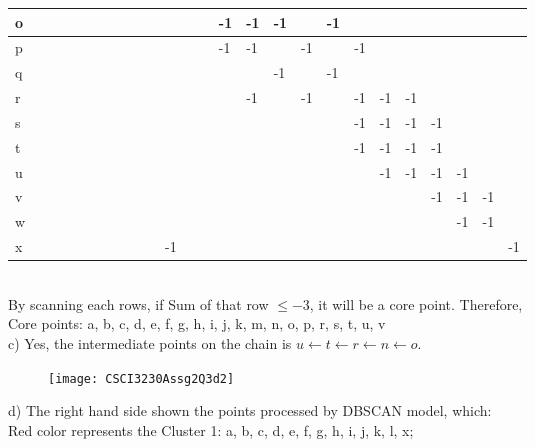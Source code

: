 \documentclass[12pt]{article}
\begin{document}
\begin{table}[h]
\begin{tabular}{|l|l|l|l|l|l|l|l|l|l|l|l|l|l|l|l|l|l|l|l|l|l|l|l|l|}
o &    &    &    &    &    &    &    &    &    &    &    &    & -1 & -1 & -1 &    & -1 &    &    &    &    &    &    &    \\ \hline
p &    &    &    &    &    &    &    &    &    &    &    &    & -1 & -1 &    & -1 &    & -1 &    &    &    &    &    &    \\ \hline
q &    &    &    &    &    &    &    &    &    &    &    &    &    &    & -1 &    & -1 &    &    &    &    &    &    &    \\ \hline
r &    &    &    &    &    &    &    &    &    &    &    &    &    & -1 &    & -1 &    & -1 & -1 & -1 &    &    &    &    \\ \hline
s &    &    &    &    &    &    &    &    &    &    &    &    &    &    &    &    &    & -1 & -1 & -1 & -1 &    &    &    \\ \hline
t &    &    &    &    &    &    &    &    &    &    &    &    &    &    &    &    &    & -1 & -1 & -1 & -1 &    &    &    \\ \hline
u &    &    &    &    &    &    &    &    &    &    &    &    &    &    &    &    &    &    & -1 & -1 & -1 & -1 &    &    \\ \hline
v &    &    &    &    &    &    &    &    &    &    &    &    &    &    &    &    &    &    &    &    & -1 & -1 & -1 &    \\ \hline
w &    &    &    &    &    &    &    &    &    &    &    &    &    &    &    &    &    &    &    &    &    & -1 & -1 &    \\ \hline
x &    &    &    &    &    &    &    &    &    & -1 &    &    &    &    &    &    &    &    &    &    &    &    &    & -1 \\ \hline
\end{tabular}
\end{table}\\
By scanning each rows, if Sum of that row $\leq -3$, it will be a core point. Therefore,\\
Core points: a, b, c, d, e, f, g, h, i, j, k, m, n, o, p, r, s, t, u, v\\[0.1in]
c) Yes, the intermediate points on the chain is $u \leftarrow t \leftarrow r \leftarrow n \leftarrow o$.\\[0.1in]
\begin{wrapfigure}[12]{o}{0.5\textwidth}
\texttt{[image: CSCI3230Assg2Q3d2]}
\end{wrapfigure} d) The right hand side shown the points processed by DBSCAN model, which:\\
Red color represents the Cluster 1: a, b, c, d, e, f, g, h, i, j, k, l, x;\\
\end{document}
